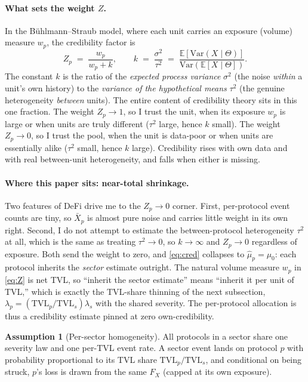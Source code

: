 \documentclass[11pt]{article}
\theoremstyle{definition}
\theoremstyle{remark}
\theoremstyle{definition}
\newtheorem{assumption}{Assumption}
\newcommand{\E}{\mathbb{E}}
\newcommand{\Var}{\mathrm{Var}}
\newcommand{\TVL}{\mathrm{TVL}}
\newcommand{\1}{\mathbf{1}}
\begin{document}
\paragraph{What sets the weight $Z$.}
In the B\"uhlmann--Straub model, where each unit carries an exposure (volume)
measure $w_p$, the credibility factor is
\begin{equation}\label{eq:Z}
Z_p \;=\; \frac{w_p}{w_p + k}, \qquad
k \;=\; \frac{\sigma^2}{\tau^2}
   \;=\; \frac{\E[\Var(X\mid\Theta)]}{\Var(\E[X\mid\Theta])}.
\end{equation}
The constant $k$ is the ratio of the \emph{expected process variance} $\sigma^2$
(the noise \emph{within} a unit's own history) to the \emph{variance of the
hypothetical means} $\tau^2$ (the genuine heterogeneity \emph{between} units).
The entire content of credibility theory sits in this one fraction. The weight
$Z_p\to1$, so I trust the unit, when its exposure $w_p$ is large or when units
are truly different ($\tau^2$ large, hence $k$ small). The weight $Z_p\to0$, so
I trust the pool, when the unit is data-poor or when units are essentially alike
($\tau^2$ small, hence $k$ large). Credibility rises with own data and with real
between-unit heterogeneity, and falls when either is missing.

\paragraph{Where this paper sits: near-total shrinkage.}
Two features of DeFi drive me to the $Z_p\to0$ corner. First, per-protocol event
counts are tiny, so $\bar X_p$ is almost pure noise and carries little weight in
its own right. Second, I do not attempt to estimate the between-protocol
heterogeneity $\tau^2$ at all, which is the same as treating $\tau^2\to0$, so
$k\to\infty$ and $Z_p\to0$ regardless of exposure. Both send the weight to zero,
and \eqref{eq:cred} collapses to $\hat\mu_p=\mu_0$: each protocol inherits the
\emph{sector} estimate outright. The natural volume measure $w_p$ in
\eqref{eq:Z} is net TVL, so ``inherit the sector estimate'' means ``inherit it
per unit of TVL,'' which is exactly the TVL-share thinning of the next
subsection, $\lambda_p=(\TVL_p/\TVL_s)\lambda_s$ with the shared severity. The
per-protocol allocation is thus a credibility estimate pinned at zero own-credibility.

\begin{assumption}[Per-sector homogeneity]\label{as:homogeneity}
All protocols in a sector share one severity law and one per-TVL event rate. A
sector event lands on protocol $p$ with probability proportional to its TVL
share $\TVL_p/\TVL_s$, and conditional on being struck, $p$'s loss is drawn from
the same $F_X$ (capped at its own exposure).
\end{assumption}
\end{document}

